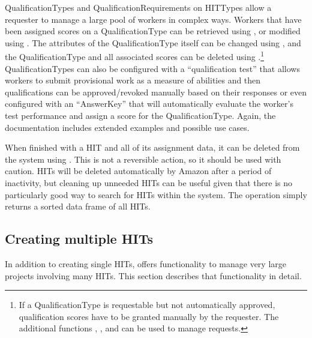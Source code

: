 QualificationTypes and QualificationRequirements on HITTypes allow a
requester to manage a large pool of workers in complex ways. Workers
that have been assigned scores on a QualificationType can be retrieved
using , or modified using
. The attributes of the
QualificationType itself can be changed using
, and the QualificationType and all
associated scores can be deleted using
.\footnote{If a QualificationType is
  requestable but not automatically approved, qualification scores
  have to be granted manually by the requester. The additional functions
  , , and
   can be used to manage requests.}
QualificationTypes can also be configured with a ``qualification
test'' that allows workers to submit provisional work as a measure of
abilities and then qualifications can be approved/revoked manually
based on their responses or even configured with an ``AnswerKey'' that
will automatically evaluate the worker's test performance and assign a
score for the QualificationType. Again, the  documentation
includes extended examples and possible use cases.

When finished with a HIT and all of its assignment data, it can be
deleted from the system using . This is not a
reversible action, so it should be used with caution. HITs will be
deleted automatically by Amazon after a period of inactivity, but
cleaning up unneeded HITs can be useful given that there is no
particularly good way to search for HITs within the system. The
 operation simply returns a sorted
data frame of all HITs.


\subsection{Creating multiple HITs}

In addition to creating single HITs,  offers functionality to manage very large projects involving many HITs. This section describes that functionality in detail.


